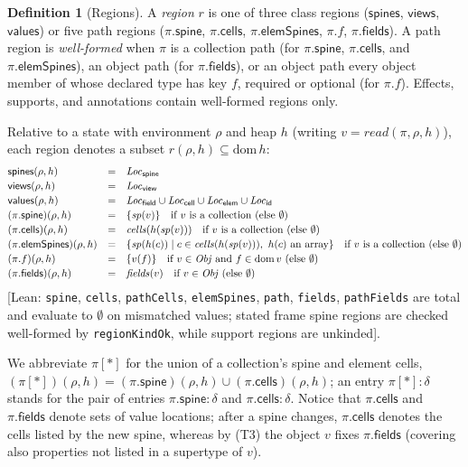 \documentclass[10pt,a4paper]{article}
\theoremstyle{definition}
\newtheorem{definition}[theorem]{Definition}
\theoremstyle{remark}
\newcommand{\kw}[1]{\mathsf{#1}}
\newcommand{\val}{\kw{values}}
\newcommand{\st}{\kw{spines}}
\newcommand{\vw}{\kw{views}}
\newcommand{\LV}{\mathit{Loc}_{\mathsf{view}}}
\newcommand{\kF}{\mathsf{field}}\newcommand{\kC}{\mathsf{cell}}\newcommand{\kE}{\mathsf{elem}}\newcommand{\kS}{\mathsf{spine}}\newcommand{\kI}{\mathsf{id}}
\newcommand{\LF}{\mathit{Loc}_{\kF}}\newcommand{\LC}{\mathit{Loc}_{\kC}}\newcommand{\LE}{\mathit{Loc}_{\kE}}\newcommand{\LS}{\mathit{Loc}_{\kS}}\newcommand{\LI}{\mathit{Loc}_{\kI}}
\newcommand{\lean}[1]{\texttt{\small #1}}
\newcommand{\status}[1]{\textsf{\small[#1]}}
\begin{document}
\begin{definition}[Regions]\label{def:regions}
A \emph{region} $r$ is one of three class regions ($\st$, $\vw$, $\val$)
or five path regions ($\pi.\kw{spine}$, $\pi.\kw{cells}$,
$\pi.\kw{elemSpines}$, $\pi.f$, $\pi.\kw{fields}$). A path region is
\emph{well-formed} when $\pi$ is a collection path (for $\pi.\kw{spine}$,
$\pi.\kw{cells}$, and $\pi.\kw{elemSpines}$), an object path (for
$\pi.\kw{fields}$), or an object path every object member of whose declared
type has key $f$, required or optional (for $\pi.f$). Effects, supports,
and annotations contain well-formed regions only.

Relative to a state with environment $\rho$ and heap $h$ (writing
$v=\mathit{read}(\pi,\rho,h)$), each region denotes a subset
$r(\rho,h)\subseteq\mathrm{dom}\,h$:
{\small\begin{displaymath}
\begin{array}{@{}lcl@{}}
\st(\rho,h) &=& \LS\\[2pt]
\vw(\rho,h) &=& \LV\\[2pt]
\val(\rho,h) &=& \LF\cup\LC\cup\LE\cup\LI\\[2pt]
(\pi.\kw{spine})(\rho,h) &=& \{\mathit{sp}(v)\}\quad\text{if }v\text{ is a collection (else }\emptyset\text{)}\\[2pt]
(\pi.\kw{cells})(\rho,h) &=& \mathit{cells}(h(\mathit{sp}(v)))\quad\text{if }v\text{ is a collection (else }\emptyset\text{)}\\[2pt]
(\pi.\kw{elemSpines})(\rho,h) &=& \{\mathit{sp}(h(c))\mid c\in\mathit{cells}(h(\mathit{sp}(v))),\ h(c)\text{ an array}\}\quad\text{if }v\text{ is a collection (else }\emptyset\text{)}\\[2pt]
(\pi.f)(\rho,h) &=& \{v(f)\}\quad\text{if }v\in\mathit{Obj}\text{ and }f\in\mathrm{dom}\,v\text{ (else }\emptyset\text{)}\\[2pt]
(\pi.\kw{fields})(\rho,h) &=& \mathit{fields}(v)\quad\text{if }v\in\mathit{Obj}\text{ (else }\emptyset\text{)}
\end{array}
\end{displaymath}}
\status{Lean: \lean{spine}, \lean{cells}, \lean{pathCells}, \lean{elemSpines}, \lean{path}, \lean{fields}, \lean{pathFields} are total and evaluate to $\emptyset$ on mismatched values; stated frame spine regions are checked well-formed by \lean{regionKindOk}, while support regions are unkinded}.
\end{definition}

\noindent
We abbreviate $\pi[\ast]$ for the union of a collection's spine and
element cells, $(\pi[\ast])(\rho,h)=(\pi.\kw{spine})(\rho,h)\cup(\pi.\kw{cells})(\rho,h)$;
an entry $\pi[\ast]:\delta$ stands for the pair of entries
$\pi.\kw{spine}:\delta$ and $\pi.\kw{cells}:\delta$. Notice that
$\pi.\kw{cells}$ and $\pi.\kw{fields}$ denote sets of value locations;
after a spine changes, $\pi.\kw{cells}$ denotes the cells listed by the
new spine, whereas by (T3) the object $v$ fixes $\pi.\kw{fields}$
(covering also properties not listed in a supertype of $v$).
\end{document}
